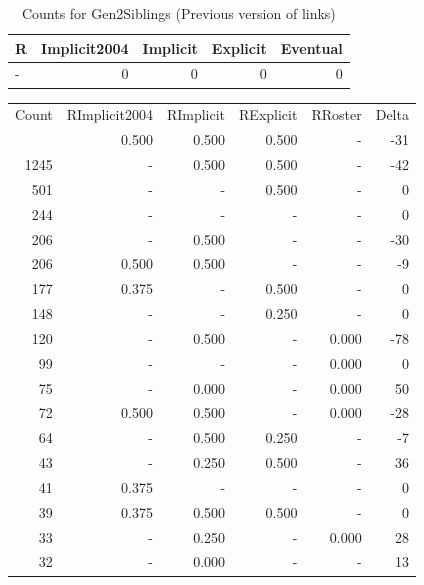 \documentclass[a4paper]{article}\usepackage[]{graphicx}\usepackage[]{color}
\begin{document}
\begin{table}[ht]
\centering
{\large
\begin{tabular}{lrrrr}
  \hline
R & Implicit2004 & Implicit & Explicit & Eventual \\ 
  \hline
- &   0 &   0 &   0 &   0 \\ 
   \hline
\end{tabular}
}
\caption{Counts for Gen2Siblings (Previous version of links)} 
\end{table}



\begin{table}[ht]
\centering
\begin{tabular}{rrrrrr}
  \hline
Count & RImplicit2004 & RImplicit & RExplicit & RRoster & Delta \\ 
  \rowcolor{goodColor}  \hline
1446 & 0.500 & 0.500 & 0.500 & - & -31 \\ 
   \rowcolor{goodColor} 1245 & - & 0.500 & 0.500 & - & -42 \\ 
   \rowcolor{sosoColor} 501 & - & - & 0.500 & - & 0 \\ 
   \rowcolor{nullColor} 244 & - & - & - & - & 0 \\ 
  206 & - & 0.500 & - & - & -30 \\ 
  206 & 0.500 & 0.500 & - & - & -9 \\ 
   \rowcolor{sosoColor} 177 & 0.375 & - & 0.500 & - & 0 \\ 
   \rowcolor{sosoColor} 148 & - & - & 0.250 & - & 0 \\ 
  120 & - & 0.500 & - & 0.000 & -78 \\ 
   \rowcolor{nullColor} 99 & - & - & - & 0.000 & 0 \\ 
  75 & - & 0.000 & - & 0.000 & 50 \\ 
  72 & 0.500 & 0.500 & - & 0.000 & -28 \\ 
   \rowcolor{badColor} 64 & - & 0.500 & 0.250 & - & -7 \\ 
   \rowcolor{badColor} 43 & - & 0.250 & 0.500 & - & 36 \\ 
   \rowcolor{nullColor} 41 & 0.375 & - & - & - & 0 \\ 
   \rowcolor{goodColor} 39 & 0.375 & 0.500 & 0.500 & - & 0 \\ 
  33 & - & 0.250 & - & 0.000 & 28 \\ 
  32 & - & 0.000 & - & - & 13 \\ 

\end{tabular}
\end{table}
\end{document}
